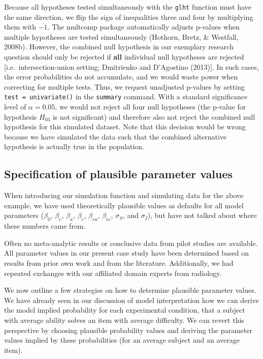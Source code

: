 \documentclass[
  man,floatsintext]{apa6}
\begin{document}
Because all hypotheses tested simultaneously with the \texttt{glht} function must have the same direction, we flip the sign of inequalities three and four by multiplying them with \(-1\). The multcomp package automatically adjusts p-values when multiple hypotheses are tested simultaneously (Hothorn, Bretz, \& Westfall, 2008b). However, the combined null hypothesis in our exemplary research question should only be rejected if \textbf{all} individual null hypotheses are rejected {[}i.e.~intersection-union setting; Dmitrienko and D'Agostino (2013){]}. In such cases, the error probabilities do not accumulate, and we would waste power when correcting for multiple tests. Thus, we request unadjusted p-values by setting \texttt{test\ =\ univariate()} in the \texttt{summary} command. With a standard significance level of \(\alpha = 0.05\), we would not reject all four null hypotheses (the p-value for hypothesis \(H_{03}\) is not significant) and therefore also not reject the combined null hypothesis for this simulated dataset. Note that this decision would be wrong because we have simulated the data such that the combined alternative hypothesis is actually true in the population.

\hypertarget{specification-of-plausible-parameter-values}{%
\subsection{Specification of plausible parameter values}\label{specification-of-plausible-parameter-values}}

When introducing our simulation function and simulating data for the above example, we have used theoretically plausible values as defaults for all model parameters (\(\beta_0\), \(\beta_e\), \(\beta_a\), \(\beta_c\), \(\beta_{ea}\), \(\beta_{ec}\), \(\sigma_S\), and \(\sigma_I\)), but have not talked about where these numbers came from.

Often no meta-analytic results or conclusive data from pilot studies are available. All parameter values in our present case study have been determined based on results from prior own work and from the literature. Additionally, we had repeated exchanges with our affiliated domain experts from radiology.

We now outline a few strategies on how to determine plausible parameter values. We have already seen in our discussion of model interpretation how we can derive the model implied probability for each experimental condition, that a subject with average ability solves an item with average difficulty. We can revert this perspective by choosing plausible probability values and deriving the parameter values implied by these probabilities (for an average subject and an average item).
\end{document}
